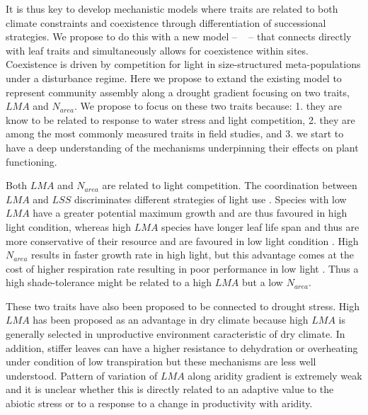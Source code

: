 \documentclass[a4paper,11pt]{article}
\begin{document}
It is thus key to develop mechanistic models where traits are related
to both climate constraints and coexistence through differentiation of successional strategies. We propose to do this with a new model -- \plant\
\citep{Falster-2016,Falster-2017} -- that connects directly with leaf
traits and simultaneously allows for coexistence within sites. Coexistence is driven by competition for light
in size-structured meta-populations under a disturbance regime. Here
we propose to extand the existing model to represent community
assembly along a drought gradient focusing on two traits, $LMA$ and
$N_{area}$. We propose to focus on these two traits because: 1. they
 are know to be related to response to water stress and light
competition, 2.  they are among the most commonly measured
traits in field studies, and 3. we start to have a deep understanding
of the mechanisms underpinning their effects on plant functioning. 

Both $LMA$ and $N_{area}$ are related to light competition. The coordination between $LMA$ and $LSS$ discriminates different
strategies of light use \citep{Falster-2018}. Species with low $LMA$
have a greater potential maximum growth and are thus favoured in high
light condition, whereas high $LMA$ species have longer leaf life span
and thus are more conservative of their resource and are favoured in
low light condition \citep{Falster-2018}. High $N_{area}$ results in faster growth rate in
high light, but this advantage comes at the cost of higher respiration
rate resulting in poor performance in low light
\citep{Falster-2018}. Thus a high shade-tolerance might be related to
a high $LMA$ but a low $N_{area}$.


These two traits have also been proposed to be connected to drought
stress. High $LMA$ has been proposed as an advantage in dry climate
because high $LMA$ is generally selected in unproductive environment
caracteristic of dry climate. In addition, stiffer leaves can have a higher resistance to dehydration
\citep{Wright-2002a,Wright-2002b} or overheating
under condition of low transpiration \citep{Leigh-2012} but these
mechanisms are less well understood.
Pattern of variation of $LMA$ along aridity gradient is extremely weak and it is unclear whether this is directly related to an adaptive value to the abiotic stress or to a response to a change in productivity with aridity.
 
\end{document}
